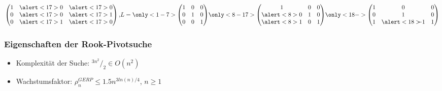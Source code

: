 \documentclass[10pt]{beamer} %
\begin{document}
\begin{frame}
\begin{equation}
{\begin{pmatrix}
        1 & \alert<17>{0} & \alert<17>{0} \\
        0 & \alert<17>{0} & \alert<17>{1} \\
        0 & \alert<17>{1} & \alert<17>{0} \\
      \end{pmatrix},
    }
    L =
    \only<1-7>{%
      \begin{pmatrix}
        1 & 0 & 0 \\
        0 & 1 & 0 \\
        0 & 0 & 1 \\
      \end{pmatrix}
    }
    \only<8-17>{%
      \begin{pmatrix}
        1 & 0 & 0 \\
        \alert<8>{0} & 1 & 0 \\
        \alert<8>{1} & 0 & 1 \\
      \end{pmatrix}
    }
    \only<18->{%
      \begin{pmatrix}
        1 & 0 & 0 \\
        0 & 1 & 0 \\
        1 & \alert<18>{\llap{$-$}1} & 1 \\
      \end{pmatrix}
    }
  \end{equation}
\end{frame}
\begin{frame}[fragile]
	\frametitle{Eigenschaften der Rook-Pivotsuche}
	\begin{itemize}[<+->]
		\item Komplexität der Suche: $^{3n^{2}}/_{2} \in O(n^2)$
		\vspace*{1em}
		\item Wachstumsfaktor: $\rho_{n}^{GERP} \leq 1.5n^{3ln(n)/4}$, $n \geq 1$
	\end{itemize}
\end{frame}
\end{document}
